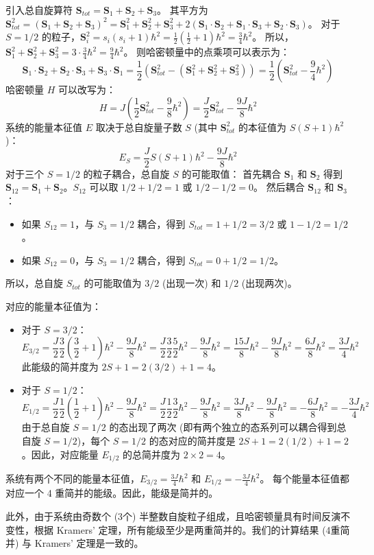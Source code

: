 \documentclass{article}
\begin{document}
引入总自旋算符 \(\mathbf{S}_{tot} = \mathbf{S}_1 + \mathbf{S}_2 + \mathbf{S}_3\)。
其平方为 \(\mathbf{S}_{tot}^2 = (\mathbf{S}_1 + \mathbf{S}_2 + \mathbf{S}_3)^2 = \mathbf{S}_1^2 + \mathbf{S}_2^2 + \mathbf{S}_3^2 + 2(\mathbf{S}_1 \cdot \mathbf{S}_2 + \mathbf{S}_1 \cdot \mathbf{S}_3 + \mathbf{S}_2 \cdot \mathbf{S}_3)\)。
对于 \(S=1/2\) 的粒子，\(\mathbf{S}_i^2 = s_i(s_i+1)\hbar^2 = \frac{1}{2}(\frac{1}{2}+1)\hbar^2 = \frac{3}{4}\hbar^2\)。
所以，\(\mathbf{S}_1^2 + \mathbf{S}_2^2 + \mathbf{S}_3^2 = 3 \cdot \frac{3}{4}\hbar^2 = \frac{9}{4}\hbar^2\)。
则哈密顿量中的点乘项可以表示为：
\[ \mathbf{S}_1 \cdot \mathbf{S}_2 + \mathbf{S}_2 \cdot \mathbf{S}_3 + \mathbf{S}_3 \cdot \mathbf{S}_1 = \frac{1}{2} (\mathbf{S}_{tot}^2 - (\mathbf{S}_1^2 + \mathbf{S}_2^2 + \mathbf{S}_3^2)) = \frac{1}{2} \left(\mathbf{S}_{tot}^2 - \frac{9}{4}\hbar^2\right) \]
哈密顿量 \(H\) 可以改写为：
\[ H = J \left( \frac{1}{2} \mathbf{S}_{tot}^2 - \frac{9}{8}\hbar^2 \right) = \frac{J}{2} \mathbf{S}_{tot}^2 - \frac{9J}{8}\hbar^2 \]
系统的能量本征值 \(E\) 取决于总自旋量子数 \(S\) (其中 \(\mathbf{S}_{tot}^2\) 的本征值为 \(S(S+1)\hbar^2\))：
\[ E_S = \frac{J}{2} S(S+1)\hbar^2 - \frac{9J}{8}\hbar^2 \]
对于三个 \(S=1/2\) 的粒子耦合，总自旋 \(S\) 的可能取值：
首先耦合 \(\mathbf{S}_1\) 和 \(\mathbf{S}_2\) 得到 \(\mathbf{S}_{12} = \mathbf{S}_1 + \mathbf{S}_2\)。\(S_{12}\) 可以取 \(1/2+1/2=1\) 或 \(1/2-1/2=0\)。
然后耦合 \(\mathbf{S}_{12}\) 和 \(\mathbf{S}_3\)：
\begin{itemize}
    \item 如果 \(S_{12}=1\)，与 \(S_3=1/2\) 耦合，得到 \(S_{tot} = 1+1/2 = 3/2\) 或 \(1-1/2 = 1/2\)。
    \item 如果 \(S_{12}=0\)，与 \(S_3=1/2\) 耦合，得到 \(S_{tot} = 0+1/2 = 1/2\)。
\end{itemize}
所以，总自旋 \(S_{tot}\) 的可能取值为 \(3/2\) (出现一次) 和 \(1/2\) (出现两次)。

对应的能量本征值为：
\begin{itemize}
    \item 对于 \(S = 3/2\)：
    \[ E_{3/2} = \frac{J}{2} \frac{3}{2}\left(\frac{3}{2}+1\right)\hbar^2 - \frac{9J}{8}\hbar^2 = \frac{J}{2} \frac{3}{2} \frac{5}{2}\hbar^2 - \frac{9J}{8}\hbar^2 = \frac{15J}{8}\hbar^2 - \frac{9J}{8}\hbar^2 = \frac{6J}{8}\hbar^2 = \frac{3J}{4}\hbar^2 \]
    此能级的简并度为 \(2S+1 = 2(3/2)+1 = 4\)。
    \item 对于 \(S = 1/2\)：
    \[ E_{1/2} = \frac{J}{2} \frac{1}{2}\left(\frac{1}{2}+1\right)\hbar^2 - \frac{9J}{8}\hbar^2 = \frac{J}{2} \frac{1}{2} \frac{3}{2}\hbar^2 - \frac{9J}{8}\hbar^2 = \frac{3J}{8}\hbar^2 - \frac{9J}{8}\hbar^2 = -\frac{6J}{8}\hbar^2 = -\frac{3J}{4}\hbar^2 \]
    由于总自旋 \(S=1/2\) 的态出现了两次 (即有两个独立的态系列可以耦合得到总自旋 \(S=1/2\))，每个 \(S=1/2\) 的态对应的简并度是 \(2S+1 = 2(1/2)+1 = 2\)。因此，对应能量 \(E_{1/2}\) 的总简并度为 \(2 \times 2 = 4\)。
\end{itemize}
系统有两个不同的能量本征值，\(E_{3/2} = \frac{3J}{4}\hbar^2\) 和 \(E_{1/2} = -\frac{3J}{4}\hbar^2\)。
每个能量本征值都对应一个 4 重简并的能级。因此，能级是简并的。

此外，由于系统由奇数个 (3个) 半整数自旋粒子组成，且哈密顿量具有时间反演不变性，根据 Kramers' 定理，所有能级至少是两重简并的。我们的计算结果 (4重简并) 与 Kramers' 定理是一致的。
\end{document}
